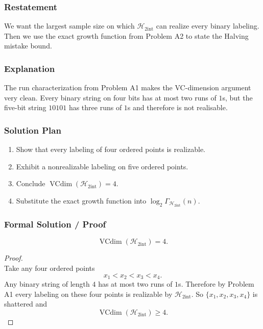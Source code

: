 \documentclass{article}
\newcommand{\vcdim}{\operatorname{VCdim}}
\newcommand{\growth}{\Gamma}
\newcommand{\classA}{\mathcal{H}_{2\mathrm{int}}}
\begin{document}
\begin{solutionbox}

\subsubsection{Restatement}

We want the largest sample size on which \(\classA\) can realize every binary
labeling. Then we use the exact growth function from Problem A2 to state the
Halving mistake bound.

\subsubsection{Explanation}

The run characterization from Problem A1 makes the VC-dimension argument very
clean. Every binary string on four bits has at most two runs of \(1\)s, but the
five-bit string \(10101\) has three runs of \(1\)s and therefore is not
realisable.

\subsubsection{Solution Plan}

\begin{enumerate}[leftmargin=2.5em]
    \item Show that every labeling of four ordered points is realizable.
    \item Exhibit a nonrealizable labeling on five ordered points.
    \item Conclude \(\vcdim(\classA)=4\).
    \item Substitute the exact growth function into \(\log_2 \growth_{\classA}(n)\).
\end{enumerate}

\subsubsection{Formal Solution / Proof}

\begin{claim}
\[
\vcdim(\classA)=4.
\]
\end{claim}

\begin{proof}
\leavevmode\\
Take any four ordered points
\[
x_1<x_2<x_3<x_4.
\]
Any binary string of length \(4\) has at most two runs of \(1\)s. Therefore by
Problem A1 every labeling on these four points is realizable by \(\classA\). So
\(\{x_1,x_2,x_3,x_4\}\) is shattered and
\[
\vcdim(\classA)\ge 4.
\]


\end{proof}
\end{solutionbox}
\end{document}
